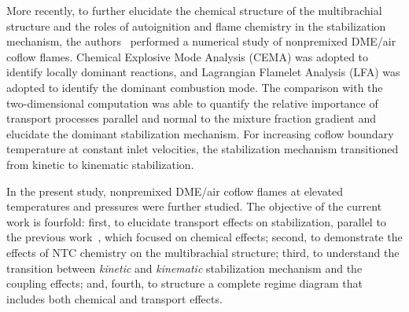 \documentclass[review,3p,times]{elsarticle}
\begin{document}
More recently, to further elucidate the chemical structure of the multibrachial structure and the roles of autoignition and flame chemistry in the stabilization mechanism, the authors~\cite{deng15} performed a numerical study of nonpremixed DME/air coflow flames.  Chemical Explosive Mode Analysis (CEMA) was adopted to identify locally dominant reactions, and Lagrangian Flamelet Analysis (LFA) was adopted to identify the dominant combustion mode.  The comparison with the two-dimensional computation was able to quantify the relative importance of transport processes parallel and normal to the mixture fraction gradient and elucidate the dominant stabilization mechanism.  For increasing coflow boundary temperature at constant inlet velocities, the stabilization mechanism transitioned from kinetic to kinematic stabilization.


\textcolor{Rv1}{In the present study, nonpremixed DME/air coflow flames at elevated temperatures and pressures were further studied.  The objective of the current work is fourfold: first, to elucidate transport effects on stabilization, parallel to the previous work~\cite{deng15}, which focused on chemical effects; second, to demonstrate the effects of NTC chemistry on the multibrachial structure; third, to understand the transition between \emph{kinetic} and \emph{kinematic} stabilization mechanism and the coupling effects; and, fourth, to structure a complete regime diagram that includes both chemical and transport effects.}
\end{document}
